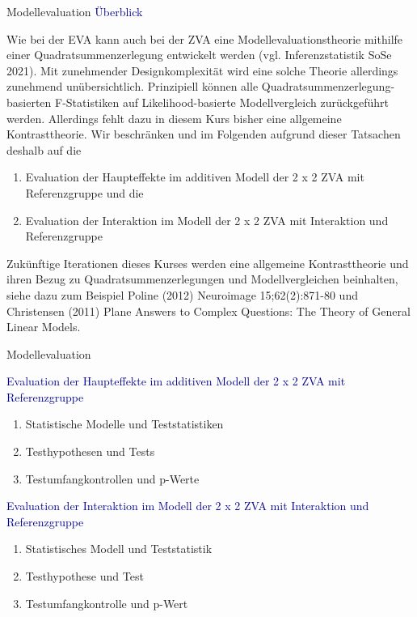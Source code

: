 \documentclass[
  8pt,
  ignorenonframetext,
]{beamer}
\providecommand{\tightlist}{%
  \setlength{\itemsep}{0pt}\setlength{\parskip}{0pt}}
\begin{document}
\begin{frame}{Modellevaluation}
\protect\hypertarget{modellevaluation}{}
\textcolor{darkblue}{Überblick}

\small

Wie bei der EVA kann auch bei der ZVA eine Modellevaluationstheorie
mithilfe einer Quadratsummenzerlegung entwickelt werden (vgl.
Inferenzstatistik SoSe 2021). Mit zunehmender Designkomplexität wird
eine solche Theorie allerdings zunehmend unübersichtlich. Prinzipiell
können alle Quadratsummenzerlegung-basierten F-Statistiken auf
Likelihood-basierte Modellvergleich zurückgeführt werden. Allerdings
fehlt dazu in diesem Kurs bisher eine allgemeine Kontrasttheorie. Wir
beschränken und im Folgenden aufgrund dieser Tatsachen deshalb auf die

\begin{enumerate}
[(1)]
\tightlist
\item
  Evaluation der Haupteffekte im additiven Modell der 2 x 2 ZVA mit
  Referenzgruppe und die
\item
  Evaluation der Interaktion im Modell der 2 x 2 ZVA mit Interaktion und
  Referenzgruppe
\end{enumerate}

Zukünftige Iterationen dieses Kurses werden eine allgemeine
Kontrasttheorie und ihren Bezug zu Quadratsummenzerlegungen und
Modellvergleichen beinhalten, siehe dazu zum Beispiel Poline (2012)
Neuroimage 15;62(2):871-80 und Christensen (2011) Plane Answers to
Complex Questions: The Theory of General Linear Models.
\end{frame}

\begin{frame}{Modellevaluation}
\protect\hypertarget{modellevaluation-1}{}

\textcolor{darkblue}{Evaluation der Haupteffekte  im additiven Modell der 2 x 2 ZVA mit Referenzgruppe}

\begin{enumerate}
[(1)]
\item
  Statistische Modelle und Teststatistiken
\item
  Testhypothesen und Tests
\item
  Testumfangkontrollen und p-Werte
\end{enumerate}

\textcolor{darkblue}{Evaluation der Interaktion im Modell der 2 x 2 ZVA mit Interaktion und Referenzgruppe}

\begin{enumerate}
[(1)]
\item
  Statistisches Modell und Teststatistik
\item
  Testhypothese und Test
\item
  Testumfangkontrolle und p-Wert
\end{enumerate}
\end{frame}
\end{document}
